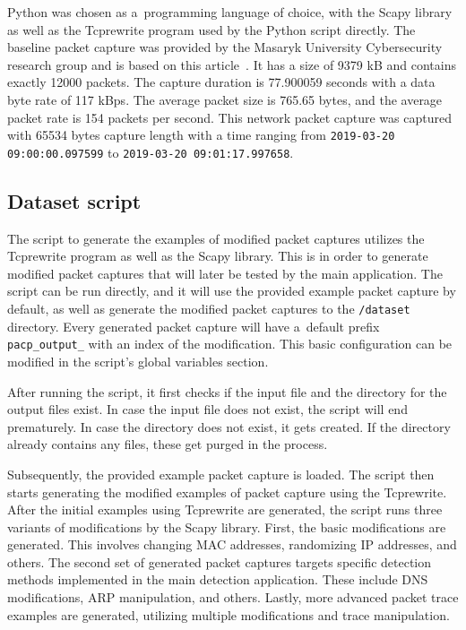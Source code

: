 \documentclass[
  printed,     %
  color,       %
  oneside,     %
  nosansbold,  %
  nocolorbold, %
  nolof,         %
  nolot,         %
]{fithesis4}
\begin{document}
Python was chosen as a~programming language of choice, with the Scapy library as well as the Tcprewrite program used by the Python script directly. The baseline packet capture was provided by the Masaryk University Cybersecurity research group and is based on this article~\cite{TOVARNAK2020105784}. It has a size of 9379 kB and contains exactly 12000 packets. The capture duration is 77.900059 seconds with a data byte rate of 117 kBps. The average packet size is 765.65 bytes, and the average packet rate is 154 packets per second. This network packet capture was captured with 65534 bytes capture length with a time ranging from \texttt{2019-03-20 09:00:00.097599} to \texttt{2019-03-20 09:01:17.997658}.

\subsection{Dataset script}

The script to generate the examples of modified packet captures utilizes the Tcprewrite program as well as the Scapy library. This is in order to generate modified packet captures that will later be tested by the main application. The script can be run directly, and it will use the provided example packet capture by default, as well as generate the modified packet captures to the \texttt{/dataset} directory. Every generated packet capture will have a~default prefix \texttt{pacp\_output\_} with an index of the modification. This basic configuration can be modified in the script's global variables section.

After running the script, it first checks if the input file and the directory for the output files exist. In case the input file does not exist, the script will end prematurely. In case the directory does not exist, it gets created. If the directory already contains any files, these get purged in the process.

Subsequently, the provided example packet capture is loaded. The script then starts generating the modified examples of packet capture using the Tcprewrite. After the initial examples using Tcprewrite are generated, the script runs three variants of modifications by the Scapy library. First, the basic modifications are generated. This involves changing MAC addresses, randomizing IP addresses, and others. The second set of generated packet captures targets specific detection methods implemented in the main detection application. These include DNS modifications, ARP manipulation, and others. Lastly, more advanced packet trace examples are generated, utilizing multiple modifications and trace manipulation.
\end{document}
